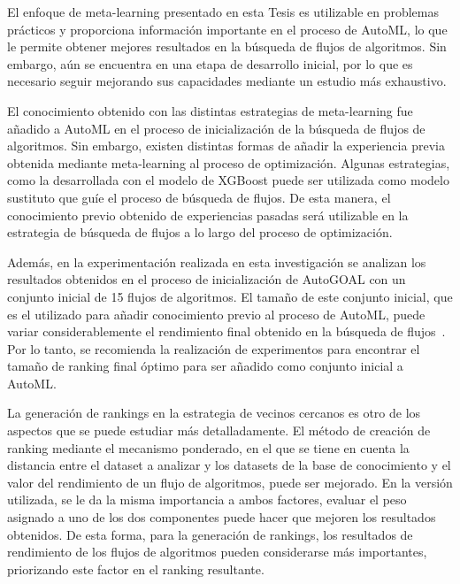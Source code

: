 \begin{recomendations}

El enfoque de meta-learning presentado en esta Tesis es utilizable en problemas prácticos y proporciona información importante en el proceso de AutoML, lo que le permite obtener mejores resultados en la búsqueda de flujos de algoritmos. Sin embargo, aún se encuentra en una etapa de desarrollo inicial, por lo que es necesario seguir mejorando sus capacidades mediante un estudio más exhaustivo.

El conocimiento obtenido con las distintas estrategias de meta-learning fue añadido a AutoML en el proceso de inicialización de la búsqueda de flujos de algoritmos. Sin embargo, existen distintas formas de añadir la experiencia previa obtenida mediante meta-learning al proceso de optimización. Algunas estrategias, como la desarrollada con el modelo de XGBoost puede ser utilizada como modelo sustituto que guíe el proceso de búsqueda de flujos. De esta manera, el conocimiento previo obtenido de experiencias pasadas será utilizable en la estrategia de búsqueda de flujos a lo largo del proceso de optimización.

Además, en la experimentación realizada en esta investigación se analizan los resultados obtenidos en el proceso de inicialización de AutoGOAL con un conjunto inicial de 15 flujos de algoritmos. El tamaño de este conjunto inicial, que es el utilizado para añadir conocimiento previo al proceso de AutoML, puede variar considerablemente el rendimiento final obtenido en la búsqueda de flujos~\cite{rankml}. Por lo tanto, se recomienda la realización de experimentos para encontrar el tamaño de ranking final óptimo para ser añadido como conjunto inicial a AutoML.

La generación de rankings en la estrategia de vecinos cercanos es otro de los aspectos que se puede estudiar más detalladamente. El método de creación de ranking mediante el mecanismo ponderado, en el que se tiene en cuenta la distancia entre el dataset a analizar y los datasets de la base de conocimiento y el valor del rendimiento de un flujo de algoritmos, puede ser mejorado. En la versión utilizada, se le da la misma importancia a ambos factores, evaluar el peso asignado a uno de los dos componentes puede hacer que mejoren los resultados obtenidos. De esta forma, para la generación de rankings, los resultados de rendimiento de los flujos de algoritmos pueden considerarse más importantes, priorizando este factor en el ranking resultante.


\end{recomendations}

